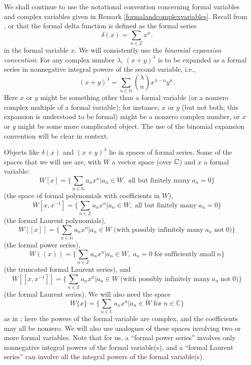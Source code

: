 \documentclass[12pt]{article}
\begin{document}
We shall continue to use the notational convention concerning formal
variables and complex variables given in Remark
\ref{formalandcomplexvariables}.  Recall {}from \cite{FLM2},
\cite{FHL} or \cite{LL} that the formal delta function is defined as
the formal series
\[
\delta(x)=\sum_{n\in {\mathbb Z}} x^n.
\]
in the formal variable $x$.  We will consistently use the {\em
binomial expansion convention}: For any complex number $\lambda$,
$(x+y)^\lambda$ is to be expanded as a formal series in nonnegative
integral powers of the second variable, i.e.,
\[
(x+y)^\lambda=\sum_{n\in {\mathbb N}} {\lambda \choose n} x^{\lambda -n}
y^n.
\]
Here $x$ or $y$ might be something other than a formal variable (or a
nonzero complex multiple of a formal variable); for instance, $x$ or
$y$ (but not both; this expansion is understood to be formal) might be
a nonzero complex number, or $x$ or $y$ might be some more complicated
object.  The use of the binomial expansion convention will be clear in
context.

Objects like $\delta(x)$ and $(x+y)^\lambda$ lie in spaces of formal
series.  Some of the spaces that we will use are, with $W$ a vector
space (over $\mathbb{C}$) and $x$ a formal variable:
\[
W[x]=\biggl\{\sum_{n\in \mathbb{N}}a_{n}x^{n}| a_{n}\in W,\;
\mbox{all but finitely many} \; a_{n} = 0\biggr\}
\]
(the space of formal polynomials with coefficients in $W$),
\[
W[x,x^{-1}]=\biggl\{\sum_{n\in \mathbb{Z}}a_{n}x^{n}| a_{n}\in W,\;
\mbox{all but finitely many} \; a_{n} = 0\biggr\}
\]
(the formal Laurent polynomials),
\[
W[[x]]=\biggl\{\sum_{n\in \mathbb{N}}a_{n}x^{n}| a_{n}\in W\;
\mbox{(with possibly infinitely many} \; a_{n} \; \mbox{not} \; 0)\biggr\}
\]
(the formal power series),
\[
W((x))=\biggl\{\sum_{n\in \mathbb{Z}}a_{n}x^{n}| a_{n}\in W,\;
a_{n} = 0 \; \mbox{for sufficiently small} \; n \biggr\}
\]
(the truncated formal Laurent series), and
\[
W[[x,x^{-1}]]=\biggl\{\sum_{n\in \mathbb{Z}}a_{n}x^{n}| a_{n}\in W\;
\mbox{(with possibly infinitely many} \; a_{n} \; \mbox{not} \; 0)\biggr\}
\]
(the formal Laurent series).  We will also need the space
\begin{equation}\label{formalserieswithcomplexpowers}
W\{ x\}=\biggl\{\sum_{n\in \mathbb{C}}a_{n}x^{n}| a_{n}\in W \;
\mbox{for} \; n\in {\mathbb C}\biggr\}
\end{equation}
as in \cite{FLM2}; here the powers of the formal variable are complex,
and the coefficients may all be nonzero.  We will also use analogues
of these spaces involving two or more formal variables.  Note that for
us, a ``formal power series'' involves only nonnegative integral
powers of the formal variable(s), and a ``formal Laurent series'' can
involve all the integral powers of the formal variable(s).
\end{document}
